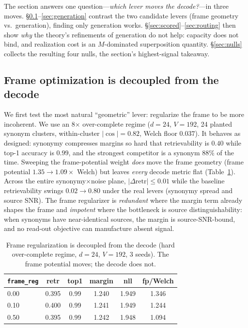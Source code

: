 \documentclass[sigconf,nonacm]{acmart}
\theoremstyle{definition}
\begin{document}
The section answers one question---\emph{which lever moves the decode?}---in three
moves. \S\ref{sec:frame}--\ref{sec:generation} contrast the two candidate levers
(frame geometry vs.\ generation), finding only generation works.
\S\ref{sec:scored}--\ref{sec:routing} then show \emph{why} the theory's refinements
of generation do not help: capacity does not bind, and realization cost is an
$M$-dominated superposition quantity. \S\ref{sec:nulls} collects the resulting four
nulls, the section's highest-signal takeaway.

\subsection{Frame optimization is decoupled from the decode}
\label{sec:frame}
We first test the most natural ``geometric'' lever: regularize the frame to be more
incoherent. We use an 8$\times$ over-complete regime ($d{=}24$, $V{=}192$, 24 planted
synonym clusters, within-cluster $|\cos|{=}0.82$, Welch floor $0.037$). It behaves as
designed: synonymy compresses margins so hard that retrievability is $0.40$ while
top-1 accuracy is $0.99$, and the strongest competitor is a synonym 88\% of the time. Sweeping the frame-potential weight \emph{does} move the frame
geometry (frame potential $1.35\to1.09\times$ Welch) but leaves \emph{every} decode
metric flat (Table~\ref{tab:frame}). Across the entire synonymy$\times$noise plane,
$|\Delta\text{retr}|\le0.01$ while the baseline retrievability swings $0.02\to0.80$
under the real levers (synonymy spread and source SNR). The frame regularizer is
\emph{redundant} where the margin term already shapes the frame and \emph{impotent}
where the bottleneck is source distinguishability: when synonyms have near-identical
sources, the margin is source-SNR-bound, and no read-out objective can manufacture
absent signal.

\begin{table}[t]
\caption{Frame regularization is decoupled from the decode (hard over-complete
regime, $d{=}24$, $V{=}192$, 3 seeds). The frame potential moves; the decode does
not.}
\label{tab:frame}
\small
\begin{tabular}{lccccc}
\toprule
\texttt{frame\_reg} & retr & top1 & margin & nll & fp/Welch \\
\midrule
0.00 & 0.395 & 0.99 & 1.240 & 1.949 & 1.346 \\
0.10 & 0.400 & 0.99 & 1.241 & 1.949 & 1.244 \\
0.50 & 0.395 & 0.99 & 1.242 & 1.948 & 1.094 \\
\bottomrule
\end{tabular}
\end{table}
\end{document}
